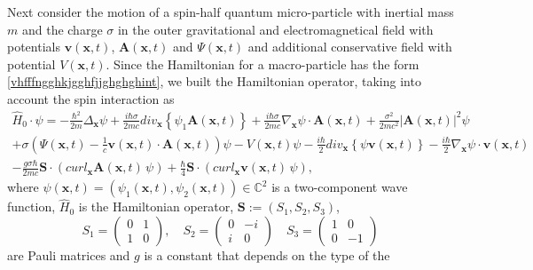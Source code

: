 \documentclass{article}
\theoremstyle{definition}
\theoremstyle{remark}
\renewcommand{\vec}[1]{\mathbf{#1}}
\newcommand{\er}{\eqref}
\newcommand{\er}{\eqref}
\begin{document}
Next consider the motion of a spin-half quantum micro-particle with
inertial mass $m$ and the charge $\sigma$ in the outer gravitational
and electromagnetical field with potentials $\vec v(\vec x,t)$,
$\vec A(\vec x,t)$ and $\Psi(\vec x,t)$ and additional conservative
field with potential $V(\vec x,t)$. Since the Hamiltonian for a
macro-particle has the form \er{vhfffngghkjgghfjjghghghint}, we
built the Hamiltonian operator, taking into account the spin
interaction as
\begin{multline}\label{vhfffngghkjgghfjjghghghSYShmyuuiiuuhmhmiopoopnniukjhjkkkllkkkZZint}
\hat H_0\cdot\psi= -\frac{\hbar^2}{2m}\Delta_{\vec
x}\psi+\frac{i\hbar\sigma}{2mc}div_{\vec x}\left\{\psi_1\vec A(\vec
x,t)\right\}+\frac{i\hbar\sigma}{2mc}\nabla_{\vec x}\psi\cdot\vec
A(\vec x,t)+\frac{\sigma^2}{2mc^2}\left|\vec A(\vec
x,t)\right|^2\psi\\+\sigma\left(\Psi(\vec x,t)-\frac{1}{c}\vec
v(\vec x,t)\cdot\vec A(\vec x,t)\right)\psi-V\left(\vec
x,t\right)\psi-\frac{i\hbar}{2}div_{\vec x}\left\{\psi\vec v(\vec
x,t)\right\}-\frac{i\hbar}{2}\nabla_{\vec x}\psi\cdot\vec v(\vec
x,t)
\\-\frac{g\sigma\hbar}{2mc}\vec
S\cdot\left(curl_{\vec x}\vec A(\vec
x,t)\,\psi\right)+\frac{\hbar}{4}\vec S\cdot\left(curl_{\vec x}\vec
v(\vec x,t)\,\psi\right),
\end{multline}
where $\psi(\vec x,t)=\left(\psi_1(\vec x,t),\psi_2(\vec
x,t)\right)\in\mathbb{C}^2$ is a two-component wave function, $\hat
H_0$ is the Hamiltonian operator, $\vec S:=(S_1,S_2,S_3)$,
$$S_1=\left(\begin{matrix}0&1\\1&0\end{matrix}\right),\quad
S_2=\left(\begin{matrix}0&-i\\i&0\end{matrix}\right)\quad
S_3=\left(\begin{matrix}1&0\\0&-1\end{matrix}\right)$$ are Pauli
matrices and $g$ is a constant that depends on the type of the
\end{document}
